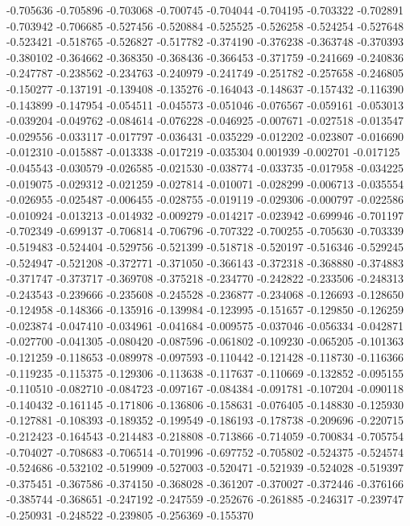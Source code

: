 -0.705636
-0.705896
-0.703068
-0.700745
-0.704044
-0.704195
-0.703322
-0.702891
-0.703942
-0.706685
-0.527456
-0.520884
-0.525525
-0.526258
-0.524254
-0.527648
-0.523421
-0.518765
-0.526827
-0.517782
-0.374190
-0.376238
-0.363748
-0.370393
-0.380102
-0.364662
-0.368350
-0.368436
-0.366453
-0.371759
-0.241669
-0.240836
-0.247787
-0.238562
-0.234763
-0.240979
-0.241749
-0.251782
-0.257658
-0.246805
-0.150277
-0.137191
-0.139408
-0.135276
-0.164043
-0.148637
-0.157432
-0.116390
-0.143899
-0.147954
-0.054511
-0.045573
-0.051046
-0.076567
-0.059161
-0.053013
-0.039204
-0.049762
-0.084614
-0.076228
-0.046925
-0.007671
-0.027518
-0.013547
-0.029556
-0.033117
-0.017797
-0.036431
-0.035229
-0.012202
-0.023807
-0.016690
-0.012310
-0.015887
-0.013338
-0.017219
-0.035304
0.001939
-0.002701
-0.017125
-0.045543
-0.030579
-0.026585
-0.021530
-0.038774
-0.033735
-0.017958
-0.034225
-0.019075
-0.029312
-0.021259
-0.027814
-0.010071
-0.028299
-0.006713
-0.035554
-0.026955
-0.025487
-0.006455
-0.028755
-0.019119
-0.029306
-0.000797
-0.022586
-0.010924
-0.013213
-0.014932
-0.009279
-0.014217
-0.023942
-0.699946
-0.701197
-0.702349
-0.699137
-0.706814
-0.706796
-0.707322
-0.700255
-0.705630
-0.703339
-0.519483
-0.524404
-0.529756
-0.521399
-0.518718
-0.520197
-0.516346
-0.529245
-0.524947
-0.521208
-0.372771
-0.371050
-0.366143
-0.372318
-0.368880
-0.374883
-0.371747
-0.373717
-0.369708
-0.375218
-0.234770
-0.242822
-0.233506
-0.248313
-0.243543
-0.239666
-0.235608
-0.245528
-0.236877
-0.234068
-0.126693
-0.128650
-0.124958
-0.148366
-0.135916
-0.139984
-0.123995
-0.151657
-0.129850
-0.126259
-0.023874
-0.047410
-0.034961
-0.041684
-0.009575
-0.037046
-0.056334
-0.042871
-0.027700
-0.041305
-0.080420
-0.087596
-0.061802
-0.109230
-0.065205
-0.101363
-0.121259
-0.118653
-0.089978
-0.097593
-0.110442
-0.121428
-0.118730
-0.116366
-0.119235
-0.115375
-0.129306
-0.113638
-0.117637
-0.110669
-0.132852
-0.095155
-0.110510
-0.082710
-0.084723
-0.097167
-0.084384
-0.091781
-0.107204
-0.090118
-0.140432
-0.161145
-0.171806
-0.136806
-0.158631
-0.076405
-0.148830
-0.125930
-0.127881
-0.108393
-0.189352
-0.199549
-0.186193
-0.178738
-0.209696
-0.220715
-0.212423
-0.164543
-0.214483
-0.218808
-0.713866
-0.714059
-0.700834
-0.705754
-0.704027
-0.708683
-0.706514
-0.701996
-0.697752
-0.705802
-0.524375
-0.524574
-0.524686
-0.532102
-0.519909
-0.527003
-0.520471
-0.521939
-0.524028
-0.519397
-0.375451
-0.367586
-0.374150
-0.368028
-0.361207
-0.370027
-0.372446
-0.376166
-0.385744
-0.368651
-0.247192
-0.247559
-0.252676
-0.261885
-0.246317
-0.239747
-0.250931
-0.248522
-0.239805
-0.256369
-0.155370
